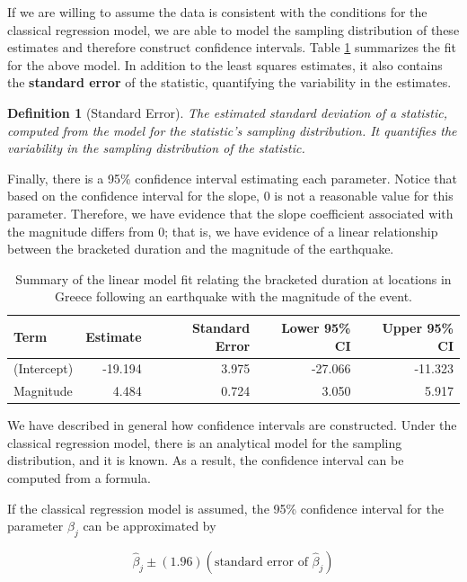 \documentclass[
]{book}
\theoremstyle{plain}
\theoremstyle{mydefn}
\newtheorem{definition}{Definition}[chapter]
\theoremstyle{myexmpl}
\theoremstyle{remark}
\begin{document}
If we are willing to assume the data is consistent with the conditions for the classical regression model, we are able to model the sampling distribution of these estimates and therefore construct confidence intervals. Table \ref{tab:regconditions-slr-summary} summarizes the fit for the above model. In addition to the least squares estimates, it also contains the \textbf{standard error} of the statistic, quantifying the variability in the estimates.

\begin{definition}[Standard Error]
\protect\hypertarget{def:defn-standard-error}{}{\label{def:defn-standard-error} {} }The estimated standard deviation of a statistic, computed from the model for the statistic's sampling distribution. It quantifies the variability in the sampling distribution of the statistic.
\end{definition}

Finally, there is a 95\% confidence interval estimating each parameter. Notice that based on the confidence interval for the slope, 0 is not a reasonable value for this parameter. Therefore, we have evidence that the slope coefficient associated with the magnitude differs from 0; that is, we have evidence of a linear relationship between the bracketed duration and the magnitude of the earthquake.

\begin{table}

\caption{\label{tab:regconditions-slr-summary}Summary of the linear model fit relating the bracketed duration at locations in Greece following an earthquake with the magnitude of the event.}
\centering
\begin{tabular}[t]{l|r|r|r|r}
\hline
Term & Estimate & Standard Error & Lower 95\% CI & Upper 95\% CI\\
\hline
(Intercept) & -19.194 & 3.975 & -27.066 & -11.323\\
\hline
Magnitude & 4.484 & 0.724 & 3.050 & 5.917\\
\hline
\end{tabular}
\end{table}

We have described in general how confidence intervals are constructed. Under the classical regression model, there is an analytical model for the sampling distribution, and it is known. As a result, the confidence interval can be computed from a formula.

\begin{rmdtip}
If the classical regression model is assumed, the 95\% confidence interval for the parameter \(\beta_j\) can be approximated by

\[\widehat{\beta}_j \pm (1.96)\left(\text{standard error of } \widehat{\beta}_j\right)\]
\end{rmdtip}
\end{document}
